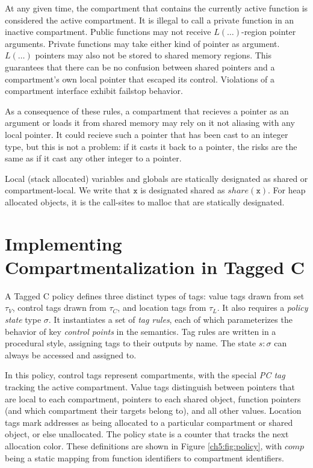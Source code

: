 At any given time, the compartment that contains the currently active function is
considered the active compartment. It is illegal to call a private function in an
inactive compartment. Public functions may not receive \(L(\dots)\)-region pointer arguments.
Private functions may take either kind of pointer as argument. \(L(\dots)\) pointers
may also not be stored to shared memory regions. This guarantees that there can be no
confusion between shared pointers and a compartment's own local pointer that
escaped its control. Violations of a compartment interface exhibit failstop behavior.

As a consequence of these rules, a compartment that recieves a pointer as an argument
or loads it from shared memory may rely on it not aliasing with any local pointer.
It could recieve such a pointer that has been cast to an integer type, but this is
not a problem: if it casts it back to a pointer, the risks are the same as if it
cast any other integer to a pointer.

Local (stack allocated) variables and globals are statically designated as shared or
compartment-local. We write that \(\mathtt{x}\) is designated shared as \(\mathit{share}(\mathtt{x})\).
For heap allocated objects, it is the call-sites to malloc that are statically designated.

\section{Implementing Compartmentalization in Tagged C}

A Tagged C policy defines three distinct types of tags: value tags 
drawn from set \(\tau_V\), control tags drawn from \(\tau_C\), and location tags
from \(\tau_L\). It also requires a {\it policy state} type \(\sigma\).
It instantiates a set of {\it tag rules}, each of which parameterizes the behavior
of key {\it control points} in the semantics. Tag rules are written in a procedural style,
assigning tags to their outputs by name. The state \(s : \sigma\) can always be accessed
and assigned to.

In this policy, control tags represent compartments, with the special {\it PC tag}
tracking the active compartment. Value tags distinguish between pointers that are local
to each compartment, pointers to each shared object, function pointers
(and which compartment their targets belong to), and all other values.
Location tags mark addresses as being allocated to a particular compartment or shared object, or
else unallocated. The policy state is a counter that tracks the next allocation color.
These definitions are shown in Figure \ref{ch5:fig:policy}, with \(\mathit{comp}\) being a
static mapping from function identifiers to compartment identifiers.

